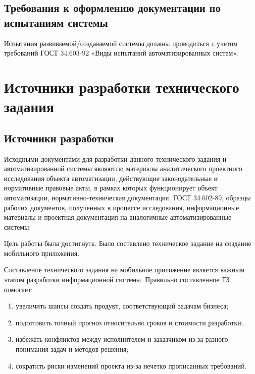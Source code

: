 \documentclass[14pt]{extreport}
\begin{document}
\section{Требования к оформлению документации по испытаниям системы}

Испытания развиваемой/создаваемой системы должны проводиться с
учетом требований ГОСТ 34.603-92 «Виды испытаний автоматизированных
систем».

\chapter{Источники разработки технического задания}

\section{Источники разработки}

Исходными документами для разработки данного технического задания и автоматизированной системы являются: материалы аналитического проектного исследования объекта автоматизации, действующие законодательные и нормативные правовые акты, в рамках которых функционирует объект автоматизации, нормативно-техническая документация, ГОСТ 34.602-89, образцы рабочих документов, полученных в процессе исследования, информационные материалы и проектная документация на аналогичные автоматизированные системы.

\conclusions

Цель работы была достигнута. Было составлено техническое задание на создание мобильного приложения.

Составление технического задания на мобильное приложение является важным этапом разработки информационной системы. Правильно составленное ТЗ помогает:
\begin{enumerate}
\item увеличить шансы создать продукт, соответствующий задачам бизнеса;
\item подготовить точный прогноз относительно сроков и стоимости разработки;
\item избежать конфликтов между исполнителем и заказчиком из-за разного понимания задач и методов решения;
\item сократить риски изменений проекта из-за нечетко прописанных требований.
\end{enumerate}
\end{document}
